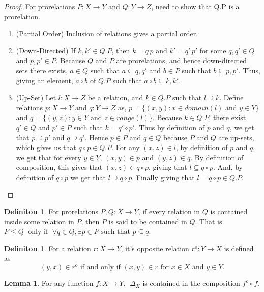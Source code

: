 \documentclass[18pt,a4paper]{article}
\theoremstyle{definition}
\newtheorem{definition}[theorem]{Definiton}
\newtheorem{lemma}[theorem]{Lemma}
\begin{document}
\begin{proof}
	For prorelations $P:X \to Y$ and $Q:Y \to Z$, need to show that Q.P is a prorelation.
	\begin{enumerate}[label=(\roman*)]
		\item (Partial Order) Inclusion of relations gives a partial order.
		\item (Down-Directed) If $k,k' \in Q.P$, then $k=q\,p$ and $k'=q'\,p'$ for some
		$q,q' \in Q$ and $p,p' \in P$. Because $Q$ and $P$ are prorelations,
		and hence down-directed sets there exists, $a \in Q$ such that
		$ a\subseteq q,q'$ and $b \in P$ such that $b \subseteq p,p'$. Thus,
		giving an element, $a\circ b$ of $Q.P$ such that $a \circ b \subseteq k, k'$.
	\item (Up-Set) Let $l:X \to Z$ be a relation, and $k \in Q.P$ such that $l \supseteq k$.
		Define relations $ p:X \to Y $ and $q:Y \to Z$ as,
		$p=\{(x,y): x \in domain(l) \text{ and } y \in Y\}$ and
		$q=\{(y,z):  y \in Y \text{ and } z \in range(l)\}$.
		Because $k\in Q.P$, there exist $q'\in Q$ and $p' \in P$ such that
		$k = q' \circ p'$. Thus by definition of $p$ and $q$, we get that
		$p \supseteq p'$ and $q \supseteq q'$. Hence $p \in P$ and $q \in Q$ because
		$P$ and $Q$ are up-sets, which gives us that $q\circ p \in Q.P$.
		For any $(x,z) \in l$, by definition
		of $p$ and $q$, we get that for every $y \in Y$, $(x,y) \in p$ and
		$(y,z) \in q $. By
		definition of composition, this gives that $(x,z) \in q \circ p$,
		giving that $l \subseteq q \circ p$. And, by definition
		of $q \circ p$ we get that $l \supseteq q \circ p$. Finally giving that
		$l=q \circ p \in Q.P$. \qedhere
	\end{enumerate}
\end{proof}
\begin{definition} %
	For prorelations $P,Q:X\to Y$, if every relation in $Q$ is contained inside some
	relation in $P$, then $P$ is said to be contained in $Q$.
	That is $P \leq Q \;\text{ only if }\;
	\forall q \in Q, \exists p \in P \text{ such that } p \subseteq q$.
\end{definition}
\begin{definition} %
	For a relation $r:X \to Y$, it's opposite relation $r^o:Y \to X$ is defined as
	\[ (y,x) \in r^o \text{ if and only if } (x,y)\in r  \text{ for } x\in X \text{ and }
	y \in Y.\]
\end{definition}
\begin{lemma}
	For any function $f:X \to Y$, $\; \Delta_X$ is contained in the composition $ f^o \circ f$.
\end{lemma}
\end{document}
